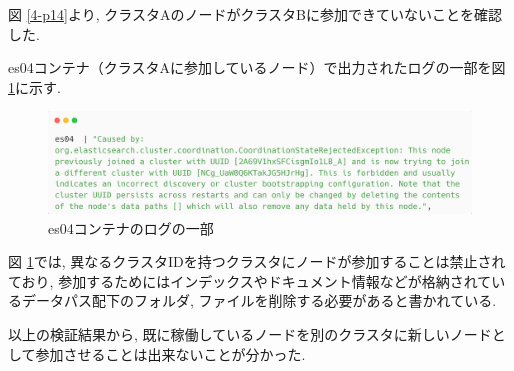 図 \ref{4-p14}より, クラスタAのノードがクラスタBに参加できていないことを確認した.

es04コンテナ（クラスタAに参加しているノード）で出力されたログの一部を図 \ref{4-p15}に示す.

\begin{figure}[H]
  \begin{center}
    \includegraphics[width=140mm]{sotu/figure/es04-log.png}
    \caption{es04コンテナのログの一部}
    \label{4-p15}
  \end{center}
\end{figure}

図 \ref{4-p15}では, 異なるクラスタIDを持つクラスタにノードが参加することは禁止されており, 参加するためにはインデックスやドキュメント情報などが格納されているデータパス配下のフォルダ, ファイルを削除する必要があると書かれている.

以上の検証結果から, 既に稼働しているノードを別のクラスタに新しいノードとして参加させることは出来ないことが分かった.





